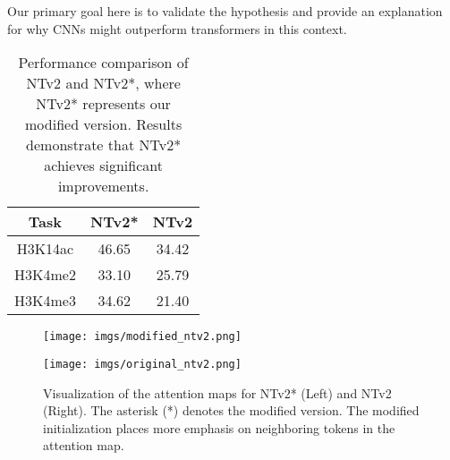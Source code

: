 Our primary goal here is to validate the hypothesis and provide an explanation for why CNNs might outperform transformers in this context.
\begin{table}[h!]
\caption{Performance comparison of NTv2 and NTv2*, where NTv2* represents our modified version. Results demonstrate that NTv2* achieves significant improvements.}
\centering
\renewcommand{\arraystretch}{1.3}
\setlength{\tabcolsep}{8pt}
\begin{tabular}{ccc}
\toprule
\multicolumn{1}{c}{\textbf{Task}} & \multicolumn{1}{c}{\textbf{NTv2*}} & \multicolumn{1}{c}{\textbf{NTv2}} \\
\midrule
H3K14ac & 46.65 & 34.42 \\
H3K4me2 & 33.10 & 25.79 \\
H3K4me3 & 34.62 & 21.40 \\
\bottomrule
\end{tabular}
\label{table:local_weight_more}
\end{table}

\begin{figure}[h!]
\centering
\begin{minipage}{0.45\textwidth}
    \centering
    \texttt{[image: imgs/modified\_ntv2.png]}  %
    \label{fig:attention_map_ntv2_star}
\end{minipage}%
\hspace{0.02\textwidth}  %
\begin{minipage}{0.45\textwidth}
    \centering
    \texttt{[image: imgs/original\_ntv2.png]}  %
    \label{fig:attention_map_ntv2}
\end{minipage}
\caption{Visualization of the attention maps for NTv2* (Left) and NTv2 (Right). The asterisk (*) denotes the modified version. The modified initialization places more emphasis on neighboring tokens in the attention map.}
\end{figure}\label{fig:local_weight_more}



